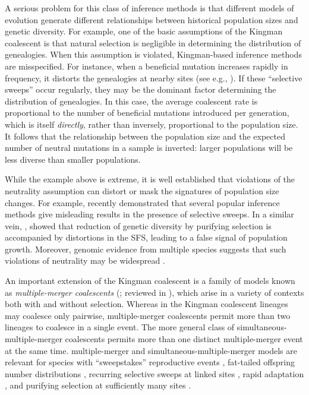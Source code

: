 \documentclass[11pt, letterpaper]{article}   	%
\begin{document}
A serious problem for this class of inference methods is that different models of evolution generate different relationships between historical population sizes and genetic diversity.
For example, one of the basic assumptions of the Kingman coalescent is that natural selection is negligible in determining the distribution of genealogies.
When this assumption is violated, Kingman-based inference methods are misspecified.
For instance, when a beneficial mutation increases rapidly in frequency, it distorts the genealogies at nearby sites (see e.g., \cite{CoopRalph2012}).
If these ``selective sweeps'' occur regularly, they may be the dominant factor determining the distribution of genealogies.
In this case, the average coalescent rate is proportional to the number of beneficial mutations introduced per generation, which is itself \emph{directly}, rather than inversely, proportional to the population size.
It follows that the relationship between the population size and the expected number of neutral mutations in a sample is inverted: larger populations will be less diverse than smaller populations.

While the example above is extreme, it is well established that violations of the neutrality assumption can distort or mask the signatures of population size changes.
For example, \textcite{SchriderEtAl2016} recently demonstrated that several popular inference methods give misleading results in the presence of selective sweeps.
In a similar vein, \textcite{CvijovicEtAl2018}, showed that reduction of genetic diversity by purifying selection is accompanied by distortions in the SFS, leading to a false signal of population growth.
Moreover, genomic evidence from multiple species suggests that such violations of neutrality may be widespread \autocite{SellaEtAl2009, Corbett-DetigEtAl2015, KernHahn2018}.

An important extension of the Kingman coalescent is a family of models known as \textit{multiple-merger coalescents} (\cite{Pitman1999, Sagitov1999, DonnellyKurtz1999,}; reviewed in \cite{Eldon2016}), which arise in a variety of contexts both with and without selection.
Whereas in the Kingman coalescent lineages may coalesce only pairwise, multiple-merger coalescents permit more than two lineages to coalesce in a single event.
The more general class of simultaneous-multiple-merger coalescents \autocite{Schweinsberg2000, MohleSagitov2001, Sagitov2003} permits more than one distinct multiple-merger event at the same time.
multiple-merger and simultaneous-multiple-merger models are relevant for species with
``sweepstakes'' reproductive events \autocite{EldonWakeley2006, SargsyanWakeley2008},
fat-tailed offspring number distributions \autocite{Schweinsberg2003},
recurring selective sweeps at linked sites \autocite{DurrettSchweinsberg2005, CoopRalph2012},
rapid adaptation \autocite{NeherHallatschek2013, DesaiEtAl2013},
and purifying selection at sufficiently many sites \autocite{SegerEtAl2010, NicolaisenDesai2012, GoodEtAl2014}.
\end{document}

